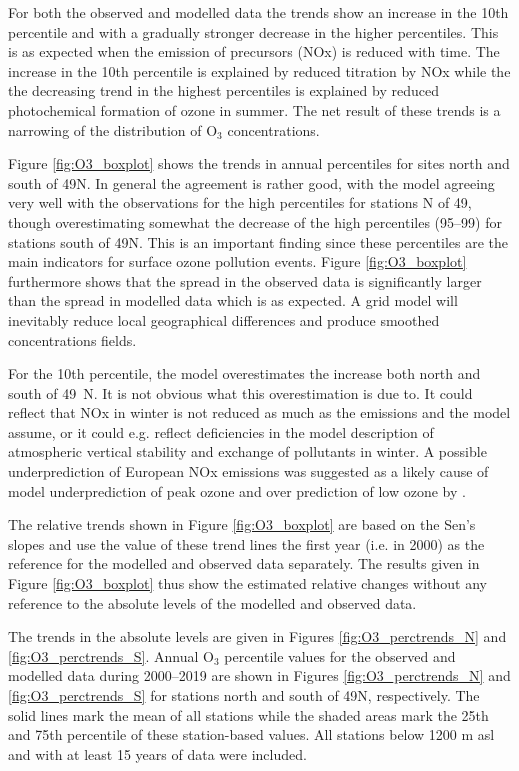 For both the observed and modelled data the trends show an increase in the 10th percentile and with a gradually stronger decrease in the higher percentiles. This is as expected when the emission of precursors (NOx) is reduced with time. The increase in the 10th percentile is explained by reduced titration by NOx while the the decreasing trend in the highest percentiles is explained by reduced photochemical formation of ozone in summer. The net result of these trends is a narrowing of the distribution of O$_3$ concentrations. 

Figure \ref{fig:O3_boxplot} shows the trends in annual percentiles for sites north and south of 49\degrees N. In general the agreement is rather good, with the model agreeing very well with the observations for the high percentiles for stations N of 49\degrees, though overestimating somewhat the decrease of the high percentiles (95--99) for stations south of 49\degrees N. This is an important finding since these percentiles are the main indicators for surface ozone pollution events. Figure \ref{fig:O3_boxplot} furthermore shows that the spread in the observed data is significantly larger than the spread in modelled data which is as expected. A grid model will inevitably reduce local geographical differences and produce smoothed concentrations fields. 

For the 10th percentile, the model overestimates the increase both north and south of \mbox{49\degrees~N}. It is not obvious what this overestimation is due to. It could reflect that NOx in winter is not reduced as much as the emissions and the model assume, or it could e.g. reflect deficiencies in the model description of atmospheric vertical stability and exchange of pollutants in winter. A possible underprediction of European NOx emissions was suggested as a likely cause of model underprediction of peak ozone and over prediction of low ozone by \citet{Oikonomakis2018}.


The relative trends shown in Figure \ref{fig:O3_boxplot} are based on the Sen's slopes and use the value of these trend lines the first year (i.e. in 2000) as the reference for the modelled and observed data separately. The results given in Figure \ref{fig:O3_boxplot} thus show the estimated relative changes without any reference to the absolute levels of the modelled and observed data. 

The trends in the absolute levels are given in Figures \ref{fig:O3_perctrends_N} and \ref{fig:O3_perctrends_S}. Annual O$_3$ percentile values for the observed and modelled data during 2000--2019 are shown in Figures \ref{fig:O3_perctrends_N} and \ref{fig:O3_perctrends_S} for stations north and south of 49\degrees N, respectively. The solid lines mark the mean of all stations while the shaded areas mark the 25th and 75th percentile of these station-based values. All stations below 1200 m asl and with at least 15 years of data were included. 

